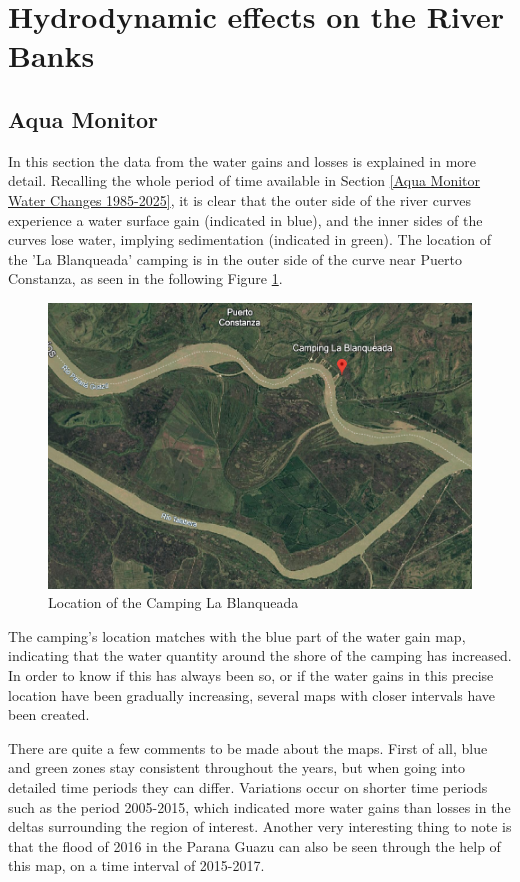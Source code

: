 \section{Hydrodynamic effects on the River Banks}
\subsection{Aqua Monitor}
\label{section:cirtical_location}
In this section the data from the water gains and losses is explained in more detail.
Recalling the whole period of time available in Section \ref{Aqua Monitor Water Changes 1985-2025}, it is clear that the outer side of the river curves experience a water surface gain (indicated in blue), and the inner sides of the curves lose water, implying sedimentation (indicated in green). 
The location of the 'La Blanqueada' camping  is in the outer side of the curve near Puerto Constanza, as seen in the following Figure \ref{fig:Camping Blanqueada}.

\begin{figure}[H]
    \centering
    \includegraphics[width=0.5\linewidth]{figures/ch5/Camping Blanqueada.png}
    \caption{Location of the Camping La Blanqueada}
    \label{fig:Camping Blanqueada}
\end{figure}

The camping's location matches with the blue part of the water gain map, indicating that the water quantity around the shore of the camping has increased. 
In order to know if this has always been so, or if the water gains in this precise location have been gradually increasing, several maps with closer intervals have been created. 

There are quite a few comments to be made about the maps. First of all, blue and green zones stay consistent throughout the years, but when going into detailed time periods they can differ. Variations occur on shorter time periods such as the period 2005-2015, which indicated more water gains than losses in the deltas surrounding the region of interest. Another very interesting thing to note is that the flood of 2016 in the Parana Guazu can also be seen through the help of this map, on a time interval of 2015-2017.

